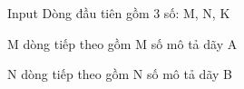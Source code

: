 Input  
Dòng đầu tiên gồm 3 số: M, N, K  

   M dòng tiếp theo gồm M số mô tả dãy A  

   N dòng tiếp theo gồm N số mô tả dãy B
